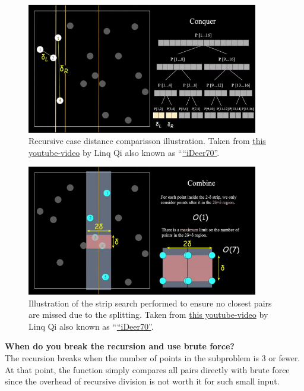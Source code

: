 \documentclass{article}
\begin{document}
\begin{figure}[H]
  \centering
  \includegraphics[width=0.9\textwidth]{figure1.png}
  \caption{Recursive case distance comparisson illustration. Taken from \href{https://www.youtube.com/watch?v=6u_hWxbOc7E}{this youtube-video} by Linq Qi also known as ``\href{https://www.youtube.com/@iDeer70}{``iDeer70''}.}
\end{figure}

\begin{figure}[H]
  \centering
  \includegraphics[width=0.9\textwidth]{figure2.png}
  \caption{Illustration of the strip search performed to ensure no closest pairs are missed due to the splitting. Taken from \href{https://www.youtube.com/watch?v=6u_hWxbOc7E}{this youtube-video} by Linq Qi also known as ``\href{https://www.youtube.com/@iDeer70}{``iDeer70''}.}
\end{figure}

\vspace{1em}
\textbf{When do you break the recursion and use brute force?} \\
The recursion breaks when the number of points in the subproblem is 3 or fewer. At that point, the function simply compares all pairs directly with brute force since the overhead of recursive division is not worth it for such small input.
\end{document}
